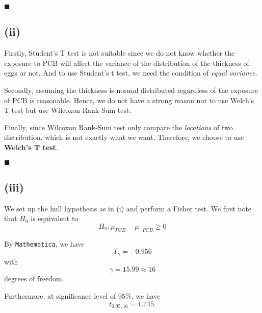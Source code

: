 \documentclass[13pt]{article}
\renewcommand{\emph}[1]{{\color{Turquoise3}\textsl{#1}}}
\newcommand{\myqed}{\hfill$\blacksquare$}
\begin{document}
\myqed

\subsection*{(ii)}
\par Firstly, Student's T test is not suitable since we do not know whether the exposure to PCB will affect the variance of 
the distribution of the thickness of eggs or not. And to use Student's t test, we need the condition of \emph{equal variance}.

\par Secondly, assuming the thickness is normal distributed regardless of the exposure of PCB is reasonable. Hence, we do not have 
a strong reason not to use Welch's T test but use Wilcoxon Rank-Sum test.

\par Finally, since Wilcoxon Rank-Sum test only compare the \emph{locations} of two distribution, which is not exactly what we want.
Therefore, we choose to use \textbf{Welch's T test}.

\myqed

\subsection*{(iii)}
\par We set up the hull hypothesis as in (i) and perform a Fisher test. We first note that $H_0$ is equivalent to 
\begin{equation*}
    H_0 : \mu_{PCB} - \mu_{\neg PCB} \geq 0
\end{equation*}

\par By {\tt Mathematica}, we have 
\begin{equation*}
    T_{\gamma} = -0.956
\end{equation*}
with 
\begin{equation*}
    \gamma = 15.99 \approx 16
\end{equation*}
degrees of freedom.

\par Furthermore, at significance level of $95\%$, we have 
\begin{equation*}
    t_{0.95, 16} = 1.745.
\end{equation*}
\end{document}

